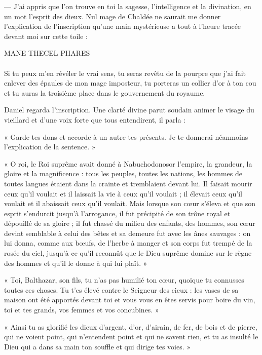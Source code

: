 \documentclass[a4paper, 11pt, oneside, polutonikogreek, french]{article}
\begin{document}
--- J'ai appris que l'on trouve en toi la sagesse, l'intelligence et la divination, en un mot l'esprit des dieux. Nul mage de Chaldée ne saurait me donner l'explication de l'inscription qu'une main mystérieuse a tout à l'heure tracée devant moi sur cette toile :

\begin{center}
MANE THECEL PHARES
\end{center}
\paragraph{}
Si tu peux m'en révéler le vrai sens, tu seras revêtu de la pourpre que j'ai fait enlever des épaules de mon mage imposteur, tu porteras un collier d'or à ton cou et tu auras la troisième place dans le gouvernement du royaume.

Daniel regarda l'inscription. Une clarté divine parut soudain animer le visage du vieillard et d'une voix forte que tous entendirent, il parla :

« Garde tes dons et accorde à un autre tes présents. Je te donnerai néanmoins l'explication de la sentence. »

« O roi, le Roi suprême avait donné à Nabuchodonosor l'empire, la grandeur, la gloire et la magnificence : tous les peuples, toutes les nations, les hommes de toutes langues étaient dans la crainte et tremblaient devant lui. Il faisait mourir ceux qu'il voulait et il laissait la vie à ceux qu'il voulait ; il élevait ceux qu'il voulait et il abaissait ceux qu'il voulait. Mais lorsque son cœur s'éleva et que son esprit s'endurcit jusqu'à l'arrogance, il fut précipité de son trône royal et dépouillé de sa gloire ; il fut chassé du milieu des enfants, des hommes, son cœur devint semblable à celui des bêtes et sa demeure fut avec les ânes sauvages : on lui donna, comme aux bœufs, de l'herbe à manger et son corps fut trempé de la rosée du ciel, jusqu'à ce qu'il reconnût que le Dieu suprême domine sur le règne des hommes et qu'il le donne à qui lui plaît. »

« Toi, Balthazar, son fils, tu n'as pas humilié ton cœur, quoique tu connusses toutes ces choses. Tu t'es élevé contre le Seigneur des cieux : les vases de sa maison ont été apportés devant toi et vous vous en êtes servis pour boire du vin, toi et tes grands, vos femmes et vos concubines. »

« Ainsi tu as glorifié les dieux d'argent, d'or, d'airain, de fer, de bois et de pierre, qui ne voient point, qui n'entendent point et qui ne savent rien, et tu as insulté le Dieu qui a dans sa main ton souffle et qui dirige tes voies. »
\end{document}
